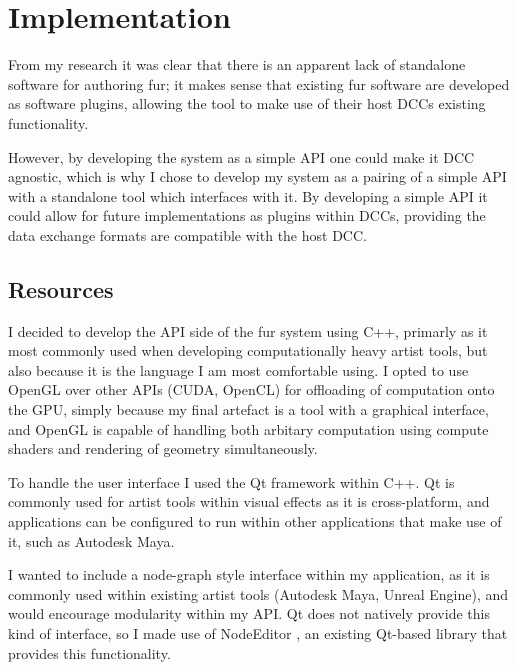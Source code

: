 \documentclass[]{acmsiggraph}
\begin{document}

\section{Implementation} \label{sec:implementation}
From my research it was clear that there is an apparent lack of standalone software for authoring fur; it makes sense that existing fur software are developed as software plugins, allowing the tool to make use of their host DCCs existing functionality.

However, by developing the system as a simple API one could make it DCC agnostic, which is why I chose to develop my system as a pairing of a simple API with a standalone tool which interfaces with it. By developing a simple API it could allow for future implementations as plugins within DCCs, providing the data exchange formats are compatible with the host DCC.

\subsection{Resources} \label{sec:resources}
I decided to develop the API side of the fur system using C++, primarly as it most commonly used when developing computationally heavy artist tools, but also because it is the language I am most comfortable using. I opted to use OpenGL over other APIs (CUDA, OpenCL) for offloading of computation onto the GPU, simply because my final artefact is a tool with a graphical interface, and OpenGL is capable of handling both arbitary computation using compute shaders and rendering of geometry simultaneously.

To handle the user interface I used the Qt framework within C++. Qt is commonly used for artist tools within visual effects as it is cross-platform, and applications can be configured to run within other applications that make use of it, such as Autodesk Maya.

I wanted to include a node-graph style interface within my application, as it is commonly used within existing artist tools (Autodesk Maya, Unreal Engine), and would encourage modularity within my API. Qt does not natively provide this kind of interface, so I made use of NodeEditor \cite{Pinaev2017}, an existing Qt-based library that provides this functionality.
\end{document}
